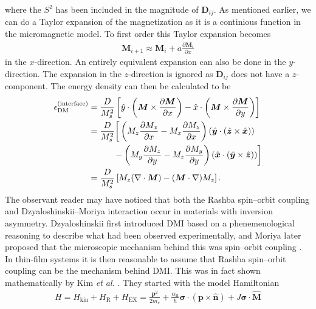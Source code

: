 where the $S^2$ has been included in the magnitude of $\mathbold{D}_{ij}$. As mentioned earlier, we can do a Taylor expansion of the magnetization as it is a continious function in the micromagnetic model. To first order this Taylor expansion becomes
\begin{align}
    \mathbold{M}_{i+1} \approx \mathbold{M}_i + a\frac{\partial\mathbold{M}_i}{\partial x}
\end{align}
in the $x$-direction. An entirely equivalent expansion can also be done in the $y$-direction. The expansion in the $z$-direction is ignored as $\mathbold{D}_{ij}$ does not have a $z$-component. The energy density can then be calculated to be
\begin{subequations}
\begin{align}
\nonumber\epsilon_{\text{DM}}^{\textrm{(interface)}} &= 
\frac{D}{M_s^2}\left[\hat{y}\cdot\left(\mathbold{M}\times\frac{\partial\mathbold{M}}{\partial x}\right) - \hat{x}\cdot\left(\mathbold{M}\times\frac{\partial\mathbold{M}}{\partial y}\right)\right] \\
\nonumber&= \frac{D}{M_s^2} \bigg[\left(M_z\frac{\partial M_x}{\partial x} - M_x \frac{\partial M_z}{\partial x}\right)(\mathbold{\hat{y}}\cdot(\mathbold{\hat{z}}\times\mathbold{\hat{x}}))\\
\label{eq:DMInterfaceCrossP}
&\hspace{10.4mm}- \left(M_y\frac{\partial M_z}{\partial y} - M_z \frac{\partial M_y}{\partial y}\right)(\mathbold{\hat{x}}\cdot(\mathbold{\hat{y}}\times\mathbold{\hat{z}}))\bigg] \\
\label{eq:DMInterface}
&= \frac{D}{M_s^2}\left[M_z(\mathbold{\nabla}\cdot\mathbold{M})-(\mathbold{M}\cdot\mathbold{\nabla})M_z\right].
\end{align}
\end{subequations}
The observant reader may have noticed that both the Rashba spin--orbit coupling and Dzyaloshinskii--Moriya interaction occur in materials with inversion asymmetry. Dzyaloshinskii first introduced DMI based on a phenemenological reasoning \citep{Dzyaloshinskii1958} to describe what had been observed experimentally, and Moriya later proposed that the microscopic mechanism behind this was spin--orbit coupling \cite{Moriya1960}. In thin-film systems it is then reasonable to assume that Rashba spin--orbit coupling can be the mechanism behind DMI. This was in fact shown mathematically by Kim \textit{et al.} \citep{DMIfromRashba_Kim}. They started with the model Hamiltonian
\begin{align}
H = H_{\textrm{kin}} + H_{\text{R}} + H_{\text{EX}} = \frac{\mathbold{p}^2}{2m_e} + \frac{\alpha_{\text{R}}}{\hbar}\mathbold{\sigma}\cdot(\mathbold{p}\times\mathbold{\hat{n}}) + J\mathbold{\sigma}\cdot\mathbold{\hat{M}}
\end{align}
